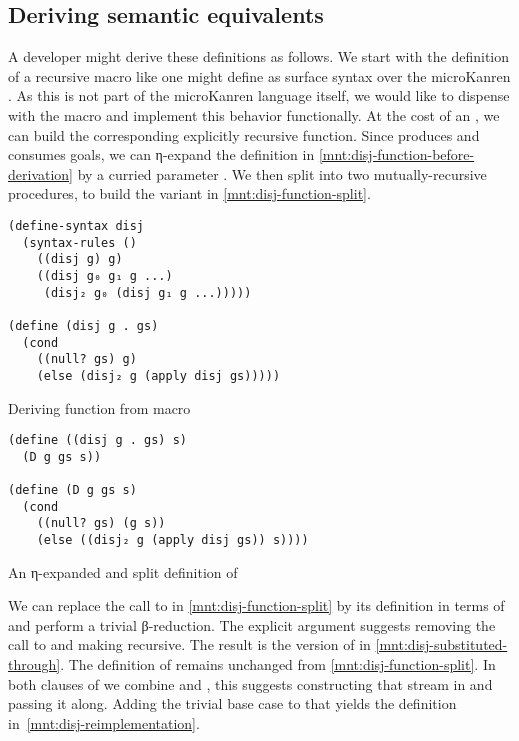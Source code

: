 \documentclass[sigplan,draft,balance,pbalance,natbib=false]{acmart}
\begin{document}
\subsection{Deriving semantic equivalents}

A developer might derive these definitions as follows. We start with
the definition of a recursive  macro like one might
define as surface syntax over the microKanren . As
this is not part of the microKanren language itself, we would like to
dispense with the macro and implement this behavior functionally. At
the cost of an , we can build the corresponding
explicitly recursive  function.
Since  produces and consumes goals, we can η-expand
the definition in \cref{mnt:disj-function-before-derivation} by a
curried parameter . We then split  into
two mutually-recursive procedures, to build the variant in
\cref{mnt:disj-function-split}.

\begin{listing}
\begin{verbatim}
(define-syntax disj
  (syntax-rules ()
    ((disj g) g)
    ((disj g₀ g₁ g ...)
     (disj₂ g₀ (disj g₁ g ...)))))

(define (disj g . gs)
  (cond
    ((null? gs) g)
    (else (disj₂ g (apply disj gs)))))
\end{verbatim}
  \caption{Deriving  function from macro}
  \label{mnt:disj-function-before-derivation}
\end{listing}

\begin{listing}
\begin{verbatim}
(define ((disj g . gs) s)
  (D g gs s))

(define (D g gs s)
  (cond
    ((null? gs) (g s))
    (else ((disj₂ g (apply disj gs)) s))))
\end{verbatim}
  \caption{An η-expanded and split definition of }
  \label{mnt:disj-function-split}
\end{listing}

We can replace the call to  in
\cref{mnt:disj-function-split} by its definition in terms
of  and perform a trivial β-reduction. The
explicit  argument suggests removing the call
to  and making  recursive. The result
is the version of  in
\cref{mnt:disj-substituted-through}. The definition
of  remains unchanged from
\cref{mnt:disj-function-split}. In both clauses of  we
combine  and , this suggests constructing
that stream in  and passing it along. Adding the
trivial base case to that  yields the definition
in~\cref{mnt:disj-reimplementation}.
\end{document}
